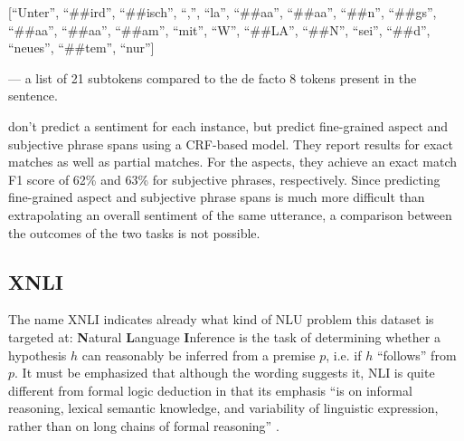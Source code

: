 [``Unter'', ``\#\#ird'', ``\#\#isch'', ``,'', ``la'', ``\#\#aa'', ``\#\#aa'', ``\#\#n'', ``\#\#gs'', ``\#\#aa'', ``\#\#aa'', ``\#\#am'', ``mit'', ``W'', ``\#\#LA'', ``\#\#N'', ``sei'', ``\#\#d'', ``neues'', ``\#\#tem'', ``nur'']

--- a list of 21 subtokens compared to the de facto 8 tokens present in the sentence.










\cite{sanger2016scare} don't predict a sentiment for each instance, but predict fine-grained
aspect and subjective phrase spans using a CRF-based model.
They report results for exact matches as well as partial matches.
For the aspects, they achieve an exact match F1 score of 62\% and 63\% for subjective phrases, respectively.
Since predicting fine-grained aspect and subjective phrase spans is much more difficult than
extrapolating an overall sentiment of the same utterance, a comparison between the outcomes of the
two tasks is not possible.


\subsection{XNLI}

The name XNLI indicates already what kind of NLU problem this dataset is targeted at:
\textbf{N}atural \textbf{L}anguage \textbf{I}nference is the task of determining whether
a hypothesis $h$ can reasonably be inferred from a premise $p$, i.e. if $h$ ``follows''
from $p$. It must be emphasized that although the wording suggests it, NLI is quite
different from formal logic deduction in that its emphasis ``is on informal reasoning,
lexical semantic knowledge, and variability of linguistic expression, rather than on
long chains of formal reasoning'' \citep{maccartney2009natural}.

